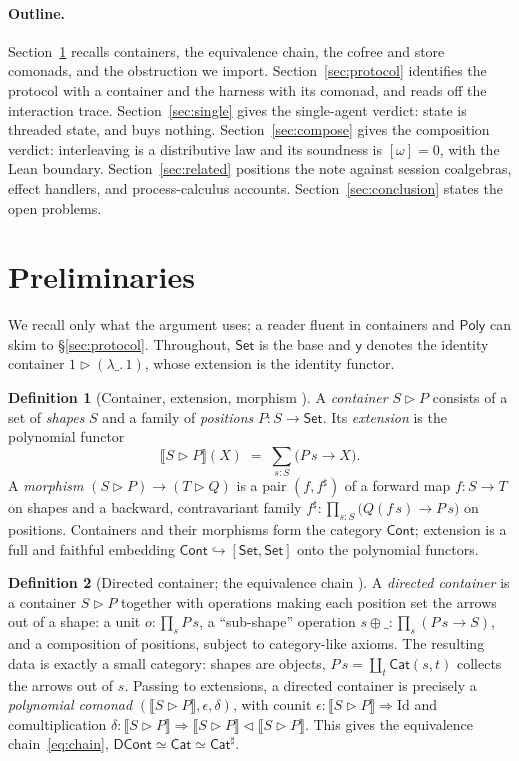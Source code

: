 \documentclass[11pt]{amsart}
\newcommand{\ctr}{\mathbin{\triangleright}}      %
\newcommand{\ext}[1]{\llbracket #1 \rrbracket}    %
\newcommand{\comp}{\mathbin{\triangleleft}}       %
\newcommand{\Set}{\mathsf{Set}}
\newcommand{\Cont}{\mathsf{Cont}}
\newcommand{\DCont}{\mathsf{DCont}}
\newcommand{\Cat}{\mathsf{Cat}}
\newcommand{\Poly}{\mathsf{Poly}}
\newcommand{\bk}[1]{{#1}^{\sharp}}                %
\newcommand{\y}{\mathsf{y}}
\theoremstyle{plain}
\theoremstyle{definition}
\newtheorem{definition}{Definition}
\theoremstyle{remark}
\begin{document}
\paragraph{Outline.}
Section~\ref{sec:prelim} recalls containers, the equivalence chain, the cofree and store comonads,
and the obstruction we import. Section~\ref{sec:protocol} identifies the protocol with a container
and the harness with its comonad, and reads off the interaction trace. Section~\ref{sec:single}
gives the single-agent verdict: state is threaded state, and buys nothing.
Section~\ref{sec:compose} gives the composition verdict: interleaving is a distributive law and its
soundness is $[\omega]=0$, with the Lean boundary. Section~\ref{sec:related} positions the note
against session coalgebras, effect handlers, and process-calculus accounts.
Section~\ref{sec:conclusion} states the open problems.

\section{Preliminaries}\label{sec:prelim}

We recall only what the argument uses; a reader fluent in containers and $\Poly$ can skim to
\S\ref{sec:protocol}. Throughout, $\Set$ is the base and $\y$ denotes the identity container
$1\ctr(\lambda\_.\,1)$, whose extension is the identity functor.

\begin{definition}[Container, extension, morphism \cite{gambinokock}]\label{def:cont}
A \emph{container} $S\ctr P$ consists of a set of \emph{shapes} $S$ and a family of \emph{positions}
$P:S\to\Set$. Its \emph{extension} is the polynomial functor
\[
  \ext{S\ctr P}(X)\;=\;\sum_{s:S}\big(P\,s\to X\big).
\]
A \emph{morphism} $(S\ctr P)\to(T\ctr Q)$ is a pair $(f,\bk f)$ of a forward map $f:S\to T$ on shapes
and a backward, contravariant family $\bk f:\prod_{s:S}\big(Q(f\,s)\to P\,s\big)$ on positions.
Containers and their morphisms form the category $\Cont$; extension is a full and faithful embedding
$\Cont\hookrightarrow[\Set,\Set]$ onto the polynomial functors.
\end{definition}

\begin{definition}[Directed container; the equivalence chain \cite{dircont}]\label{def:dcont}
A \emph{directed container} is a container $S\ctr P$ together with operations making each position
set the arrows out of a shape: a unit $o:\prod_{s}P\,s$, a ``sub-shape'' operation
$s\oplus\_:\prod_s(P\,s\to S)$, and a composition of positions, subject to category-like axioms. The
resulting data is exactly a small category: shapes are objects, $P\,s=\coprod_{t}\Cat(s,t)$ collects
the arrows out of $s$. Passing to extensions, a directed container is precisely a \emph{polynomial
comonad} $(\ext{S\ctr P},\epsilon,\delta)$, with counit $\epsilon:\ext{S\ctr P}\Rightarrow\mathrm{Id}$
and comultiplication $\delta:\ext{S\ctr P}\Rightarrow\ext{S\ctr P}\comp\ext{S\ctr P}$. This gives the
equivalence chain~\eqref{eq:chain}, $\DCont\simeq\Cat\simeq\Cat^{\sharp}$.
\end{definition}
\end{document}
